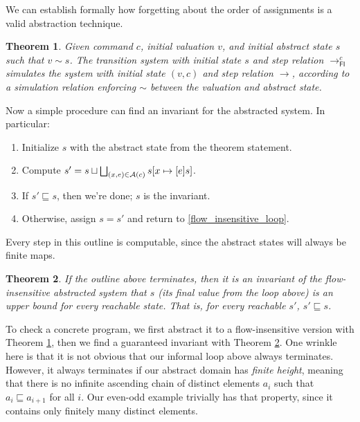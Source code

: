 \documentclass{amsbook}
\newtheorem{theorem}{Theorem}[chapter]
\theoremstyle{definition}
\theoremstyle{remark}
\numberwithin{section}{chapter}
\numberwithin{equation}{chapter}
\begin{document}
We can establish formally how forgetting about the order of assignments is a valid abstraction technique.

\begin{theorem}\label{flow_insensitive_abstraction}
  \abstraction
  Given command $c$, initial valuation $v$, and initial abstract state $s$ such that $v \sim s$.  The transition system with initial state $s$ and step relation $\to^c_\mathsf{FI}$ simulates the system with initial state $(v, c)$ and step relation $\to$, according to a simulation relation enforcing $\sim$ between the valuation and abstract state.
\end{theorem}

Now a simple procedure can find an invariant for the abstracted system.
In particular:

\begin{enumerate}
\item Initialize $s$ with the abstract state from the theorem statement.
\item \label{flow_insensitive_loop}Compute $s' = s \sqcup \bigsqcup_{(x, e) \in \mathcal A(c)} s[x \mapsto [e]s]$.
\item If $s' \sqsubseteq s$, then we're done; $s$ is the invariant.
\item Otherwise, assign $s = s'$ and return to \ref{flow_insensitive_loop}.
\end{enumerate}

Every step in this outline is computable, since the abstract states will always be finite maps.

\begin{theorem}\label{flow_insensitive_iteration}
  \invariants
  If the outline above terminates, then it is an invariant of the flow-insensitive abstracted system that $s$ (its final value from the loop above) is an upper bound for every reachable state.  That is, for every reachable $s'$, $s' \sqsubseteq s$.
\end{theorem}

To check a concrete program, we first abstract it to a flow-insensitive version with Theorem \ref{flow_insensitive_abstraction}, then we find a guaranteed invariant with Theorem \ref{flow_insensitive_iteration}.
One wrinkle here is that it is not obvious that our informal loop above always terminates.
However, it always terminates if our abstract domain has \emph{finite height}, meaning that there is no infinite ascending chain of distinct elements $a_i$ such that $a_i \sqsubseteq a_{i+1}$ for all $i$.
Our even-odd example trivially has that property, since it contains only finitely many distinct elements.
\end{document}
